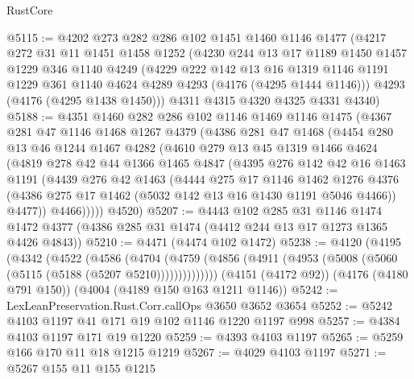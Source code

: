 \begin{lexlean}{RustCore}
\begin{coremodule}
@5115 := @4202
    @273
    @282
    @286
    @102
    @1451
    @1460
    @1146
    @1477
    (@4217
      @272
      @31
      @11
      @1451
      @1458
      @1252
      (@4230
        @244
        @13
        @17
        @1189
        @1450
        @1457
        @1229
        @346
        @1140
        @4249
        (@4229
          @222
          @142
          @13
          @16
          @1319
          @1146
          @1191
          @1229
          @361
          @1140
          @4624
          @4289
          @4293
          (@4176 (@4295 @1444 @1146)))
        @4293
        (@4176 (@4295 @1438 @1450)))
      @4311
      @4315
      @4320
      @4325
      @4331
      @4340)
@5188 := @4351
    @1460
    @282
    @286
    @102
    @1146
    @1469
    @1146
    @1475
    (@4367
      @281
      @47
      @1146
      @1468
      @1267
      @4379
      (@4386
        @281
        @47
        @1468
        (@4454
          @280
          @13
          @46
          @1244
          @1467
          @4282
          (@4610
            @279
            @13
            @45
            @1319
            @1466
            @4624
            (@4819
              @278
              @42
              @44
              @1366
              @1465
              @4847
              (@4395
                @276
                @142
                @42
                @16
                @1463
                @1191
                (@4439
                  @276
                  @42
                  @1463
                  (@4444
                    @275
                    @17
                    @1146
                    @1462
                    @1276
                    @4376
                    (@4386 @275 @17 @1462 (@5032 @142 @13 @16 @1430 @1191 @5046 @4466))
                    @4477))
                @4466)))))
      @4520)
@5207 := @4443
    @102
    @285
    @31
    @1146
    @1474
    @1472
    @4377
    (@4386 @285 @31 @1474 (@4412 @244 @13 @17 @1273 @1365 @4426 @4843))
@5210 := @4471 (@4474 @102 @1472)
@5238 := @4120
    (@4195
      (@4342
        (@4522
          (@4586
            (@4704
              (@4759 (@4856 (@4911 (@4953 (@5008 (@5060 (@5115 (@5188 (@5207 @5210))))))))))))))
    (@4151 (@4172 @92))
    (@4176 (@4180 @791 @150))
    (@4004 (@4189 @150 @163 @1211 @1146))
@5242 := LexLeanPreservation.Rust.Corr.callOps @3650 @3652 @3654
@5252 := @5242 @4103 @1197 @41 @171 @19 @102 @1146 @1220 @1197 @998
@5257 := @4384 @4103 @1197 @171 @19 @1220
@5259 := @4393 @4103 @1197
@5265 := @5259 @166 @170 @11 @18 @1215 @1219
@5267 := @4029 @4103 @1197
@5271 := @5267 @155 @11 @155 @1215

\end{coremodule}
\end{lexlean}
